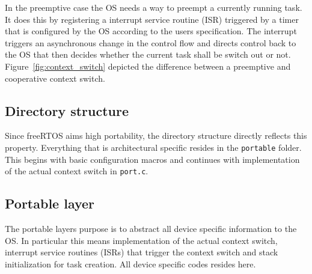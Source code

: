 In the preemptive case the OS needs a way to preempt a currently running task. It does this by registering a interrupt service routine (ISR) triggered by a timer that is configured by the OS according to the users specification. The interrupt triggers an asynchronous change in the control flow and directs control back to the OS that then decides whether the current task shall be switch out or not. Figure~\ref{fig:context_switch} depicted the difference between a preemptive and cooperative context switch.

\subsection{Directory structure}

Since freeRTOS aims high portability, the directory structure directly reflects this property. Everything that is architectural specific resides in the \verb+portable+ folder. This begins with basic configuration macros and continues with implementation of the actual context switch in \verb+port.c+.

\begin{minipage}{\linewidth}
\begin{flushleft}
\end{flushleft}
\end{minipage}
\subsection{Portable layer}

The portable layers purpose is to abstract all device specific information to the OS. In particular this means implementation of the actual context switch, interrupt service routines (ISRs) that trigger the context switch and stack initialization for task creation. All device specific codes resides here.


